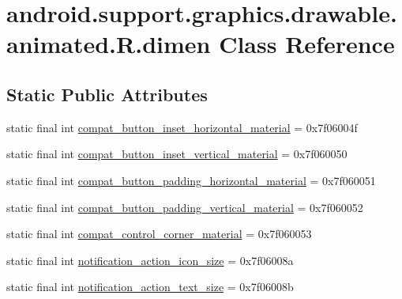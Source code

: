 \hypertarget{classandroid_1_1support_1_1graphics_1_1drawable_1_1animated_1_1R_1_1dimen}{}\section{android.\+support.\+graphics.\+drawable.\+animated.\+R.\+dimen Class Reference}
\label{classandroid_1_1support_1_1graphics_1_1drawable_1_1animated_1_1R_1_1dimen}
\subsection*{Static Public Attributes}
\begin{DoxyCompactItemize}
\item 
static final int \mbox{\hyperlink{classandroid_1_1support_1_1graphics_1_1drawable_1_1animated_1_1R_1_1dimen_ae0507725a2fa6747595298ec45712abd}{compat\+\_\+button\+\_\+inset\+\_\+horizontal\+\_\+material}} = 0x7f06004f
\item 
static final int \mbox{\hyperlink{classandroid_1_1support_1_1graphics_1_1drawable_1_1animated_1_1R_1_1dimen_a6a82ebce1ae0d9c4c2006c8cf3f41b27}{compat\+\_\+button\+\_\+inset\+\_\+vertical\+\_\+material}} = 0x7f060050
\item 
static final int \mbox{\hyperlink{classandroid_1_1support_1_1graphics_1_1drawable_1_1animated_1_1R_1_1dimen_a560835b69a502308d2260c9a55eb3d32}{compat\+\_\+button\+\_\+padding\+\_\+horizontal\+\_\+material}} = 0x7f060051
\item 
static final int \mbox{\hyperlink{classandroid_1_1support_1_1graphics_1_1drawable_1_1animated_1_1R_1_1dimen_a5f6d5ea0b964fb256ee9c2ce0faf95ee}{compat\+\_\+button\+\_\+padding\+\_\+vertical\+\_\+material}} = 0x7f060052
\item 
static final int \mbox{\hyperlink{classandroid_1_1support_1_1graphics_1_1drawable_1_1animated_1_1R_1_1dimen_a84be4e4e24b1bdf17eddfd88e078615f}{compat\+\_\+control\+\_\+corner\+\_\+material}} = 0x7f060053
\item 
static final int \mbox{\hyperlink{classandroid_1_1support_1_1graphics_1_1drawable_1_1animated_1_1R_1_1dimen_a0ae163d5f1a8a26eaa9c0ee9f4353bda}{notification\+\_\+action\+\_\+icon\+\_\+size}} = 0x7f06008a
\item 
static final int \mbox{\hyperlink{classandroid_1_1support_1_1graphics_1_1drawable_1_1animated_1_1R_1_1dimen_aa04d155db47f128bff62166ec70a1ac1}{notification\+\_\+action\+\_\+text\+\_\+size}} = 0x7f06008b

\end{DoxyCompactItemize}
